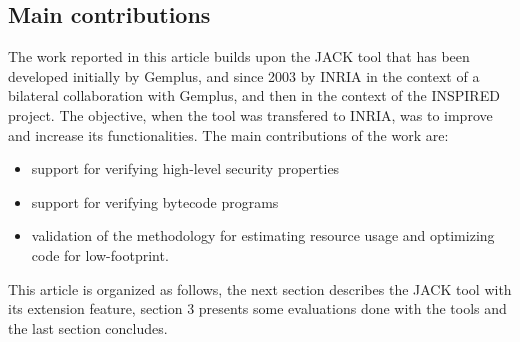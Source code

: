 \subsection{Main contributions}
The work reported in this article builds upon the JACK tool that has been developed initially by Gemplus, and since 2003 by INRIA
in the context of a bilateral collaboration with Gemplus, and then
in the context of the INSPIRED project.
The objective, when the tool was transfered to INRIA, was to improve and increase its functionalities. The main contributions of the work are:
\begin{itemize}
\item support for verifying high-level security properties
\item support for verifying bytecode programs
\item validation of the methodology for estimating resource
usage and optimizing code for low-footprint.
\end{itemize}

This article is organized as follows, the next section describes the JACK tool with its
extension feature, section 3 presents some evaluations done with the
tools and the last section concludes.
